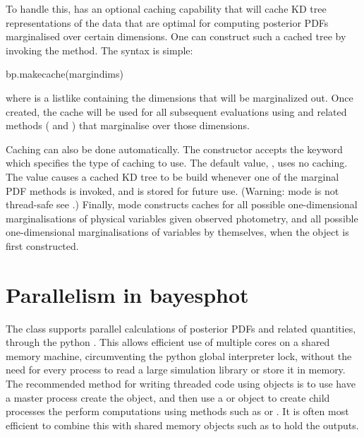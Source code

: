 \documentclass[letterpaper,10pt,english]{sphinxmanual}
\begin{document}
To handle this,  has an optional caching capability that will
cache KD tree representations of the data that are optimal for
computing posterior PDFs marginalised over certain dimensions. One can
construct such a cached tree by invoking the 
method. The syntax is simple:

\begin{sphinxVerbatim}[commandchars=\\\{\}]
bp.make\PYGZus{}cache(margindims)
\end{sphinxVerbatim}

where  is a listlike containing the dimensions that will
be marginalized out. Once created, the cache will be used for all
subsequent evaluations using  and related methods
( and ) that marginalise over those
dimensions.

Caching can also be done automatically. The  constructor accepts
the keyword  which specifies the type of caching to
use. The default value, , uses no caching. The value 
causes a cached KD tree to be build whenever one of the marginal PDF
methods is invoked, and is stored for future use. (Warning: 
mode is not thread-safe \textendash{} see {\hyperref[\detokenize{bayesphot:ssec-bayesphot-threading}]{}}.)
Finally,  mode constructs caches for all possible
one-dimensional marginalisations of physical variables given observed
photometry, and all possible one-dimensional marginalisations of
variables by themselves, when the  object is first constructed.


\section{Parallelism in bayesphot}
\label{\detokenize{bayesphot:parallelism-in-bayesphot}}\label{\detokenize{bayesphot:ssec-bayesphot-threading}}
The  class supports parallel calculations of posterior PDFs and
related quantities, through the python . This
allows efficient use of multiple cores on a shared memory machine,
circumventing the python global interpreter lock, without the need for
every process to read a large simulation library or store it in
memory. The recommended method for writing threaded code using 
objects is to use have a master process create the  object, and
then use a 
or 
object to create child processes the perform computations using 
methods such as  or . It is often most efficient
to combine this with shared memory objects such as 
to hold the outputs.
\end{document}
